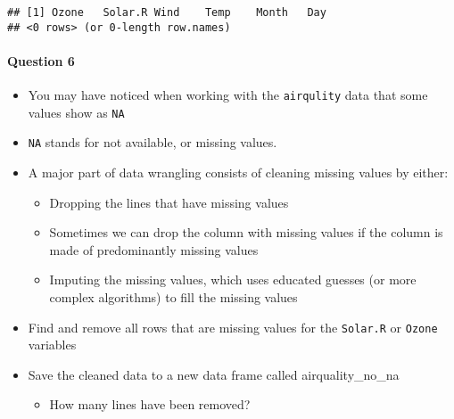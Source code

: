 \documentclass[
]{article}
\newenvironment{Shaded}{\begin{snugshade}}{\end{snugshade}}
\newcommand{\CommentTok}[1]{\textcolor[rgb]{0.56,0.35,0.01}{\textit{#1}}}
\newcommand{\KeywordTok}[1]{\textcolor[rgb]{0.13,0.29,0.53}{\textbf{#1}}}
\newcommand{\NormalTok}[1]{#1}
\newcommand{\OperatorTok}[1]{\textcolor[rgb]{0.81,0.36,0.00}{\textbf{#1}}}
\newcommand{\OtherTok}[1]{\textcolor[rgb]{0.56,0.35,0.01}{#1}}
\newcommand{\StringTok}[1]{\textcolor[rgb]{0.31,0.60,0.02}{#1}}
\providecommand{\tightlist}{%
  \setlength{\itemsep}{0pt}\setlength{\parskip}{0pt}}
\begin{document}
\begin{verbatim}
## [1] Ozone   Solar.R Wind    Temp    Month   Day    
## <0 rows> (or 0-length row.names)
\end{verbatim}

\hypertarget{question-6}{%
\paragraph{Question 6}\label{question-6}}

\begin{itemize}
\tightlist
\item
  You may have noticed when working with the \texttt{airqulity} data
  that some values show as \texttt{NA}
\item
  \texttt{NA} stands for not available, or missing values.
\item
  A major part of data wrangling consists of cleaning missing values by
  either:

  \begin{itemize}
  \tightlist
  \item
    Dropping the lines that have missing values
  \item
    Sometimes we can drop the column with missing values if the column
    is made of predominantly missing values
  \item
    Imputing the missing values, which uses educated guesses (or more
    complex algorithms) to fill the missing values
  \end{itemize}
\item
  Find and remove all rows that are missing values for the
  \texttt{Solar.R} or \texttt{Ozone} variables
\item
  Save the cleaned data to a new data frame called airquality\_no\_na

  \begin{itemize}
  \tightlist
  \item
    How many lines have been removed?
  \end{itemize}
\end{itemize}

\begin{Shaded}
\end{Shaded}
\end{document}
